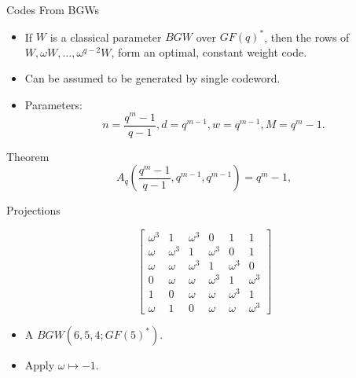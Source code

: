 \documentclass{beamer}
\newcommand{\M}{A}
\begin{document}
 
 \begin{frame}{Codes From BGWs}
 
 \begin{itemize}
  \item If $W$ is a classical parameter $BGW$ over $GF(q)^*$, then the rows of $W,\omega W, \dots, \omega^{q-2}W$, form an optimal, constant weight code.
  \item Can be assumed to be generated by single codeword.
  \item Parameters:
  $$
  n=\frac{q^m-1}{q-1}, d=q^{m-1}, w=q^{m-1}, M=q^m-1.
  $$
 \end{itemize}
 
 \begin{block}{Theorem}
  $$
  \M_q\left( \frac{q^m-1}{q-1},q^{m-1},q^{m-1} \right) = q^m-1,
  $$
 \end{block}
  
 \end{frame}
 
 
 \begin{frame}{Projections}
  
  \[
   \left[\begin{array}{cccccc}
\omega^3&1&\omega^3&0&1&1\\
\omega&\omega^3&1&\omega^3&0&1\\
\omega&\omega&\omega^3&1&\omega^3&0\\
0&\omega&\omega&\omega^3&1&\omega^3\\ 
1&0&\omega&\omega&\omega^3&1\\ 
\omega&1&0&\omega&\omega&\omega^3
  \end{array}\right]
  \]

  \begin{itemize}
  \item A $BGW(6,5,4;GF(5)^*)$.
   \item\pause Apply $\omega \mapsto -1$.
  \end{itemize}
  
 \end{frame}

 
\end{document}
